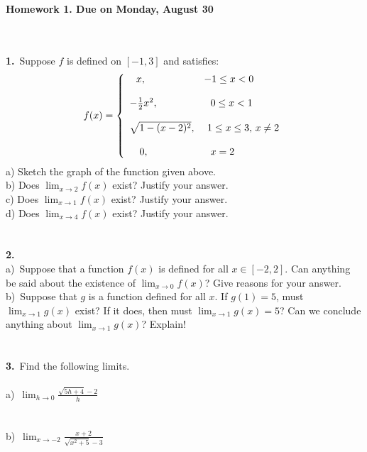 \documentclass[12pt]{article}
\newcommand{\ds}{\displaystyle}
\newcommand{\Frac}{\displaystyle \frac}
\begin{document}
\begin{center}
\textbf{Homework 1. Due on Monday, August 30} \\
\end{center}\
\\
\\
\textbf{1.}\ Suppose $f$ is defined on $[-1,3]$ and satisfies:
$$ f(x)=\left\{
              \begin{array}{ll}
              \ \ x, &  \hbox{$-1\leq x<0$}\\
              \\
              -\frac{1}{2}x^{2}, & \  \  \hbox{$0\leq x<1$}\\
              \\
              \sqrt{1-(x-2)^{2}}, & \  \hbox{$1\leq x\leq3$, $x\neq2$}\\
              \\
              \ \ \ 0, & \  \  \hbox{$x=2$}
              \end{array}
            \right. $$
a) Sketch the graph of the function given above.\\
b) Does $\ds\lim_{x\to 2}f(x)$ exist? Justify your answer.\\
c) Does $\ds\lim_{x\to 1}f(x)$ exist? Justify your answer.\\
d) Does $\ds\lim_{x\to 4}f(x)$ exist? Justify your answer.\\
\\
\\
\textbf{2.}\\
a)\ Suppose that a function $f(x)$ is defined for all $x\in[-2,2]$.
Can anything be said about the existence of $\ds\lim_{x\to 0}f(x)$?
Give reasons for your answer.\\
b)\ Suppose that $g$ is a function defined for all $x$. If $g(1)=5$,
must $\ds\lim_{x\to1}g(x)$ exist? If it does, then must $
\ds\lim_{x\to1}g(x)=5$? Can we conclude anything about
$\ds\lim_{x\to1}g(x)$? Explain!
\\
\\
\\
\textbf{3.}\ Find the following limits.\\
\\
a)\ $\ds\lim_{h\to 0}\Frac{\sqrt{5h+4}-2}{h}$\\
\\
\\
b)\ $\ds\lim_{x\to -2}\Frac{x+2}{\sqrt{x^2+5}-3}$\\
\\
\\
\end{document}
